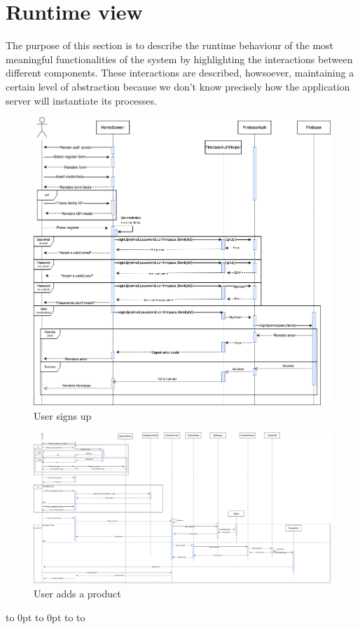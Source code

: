 \section{Runtime view}
The purpose of this section is to describe the runtime behaviour of the most
meaningful functionalities of the system by highlighting the interactions between different components. These interactions are described, howsoever, maintaining a certain level of abstraction because we don’t know precisely how the application server will instantiate its processes.


\begin{figure}[H]
  \includegraphics[scale=0.45]{./Images/runtime/sequence1.png}
  \caption{User signs up}
\end{figure}





\def\fillandplacepagenumber{%
 \par\pagestyle{empty}%
\vbox to 0pt{\vss}\vfill
\vbox to 0pt{\baselineskip0pt
   \hbox to\linewidth{\hss}%
   \setlength{\footskip}{70pt}
   \baselineskip\footskip
   \hbox to\linewidth{%
     \hfil\thepage\hfil}\vss}}

\begin{landscape}
\begin{figure}[h]
\vspace*{-2cm}
\noindent
\centering
\centerline{\includegraphics[scale = 0.37]{./Images/runtime/sequence2.png}}
\vspace*{-1cm}
    \caption{User adds a product}
    \vspace*{-12cm}
\end{figure}
\fillandplacepagenumber
\end{landscape}